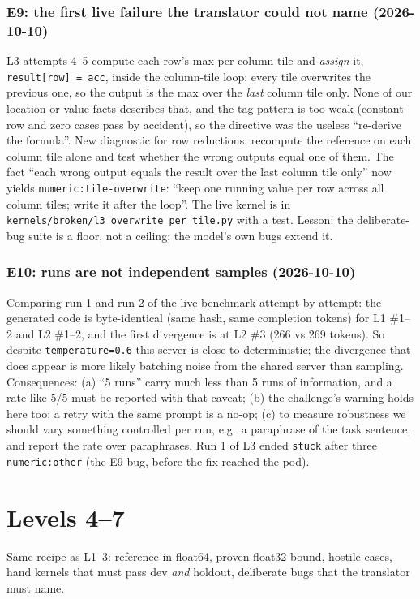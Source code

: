 \documentclass[11pt]{article}
\newcommand{\code}[1]{\texttt{#1}}
\newcommand{\entry}[2]{\subsubsection*{#1 \textnormal{\small(#2)}}}
\begin{document}
\entry{E9: the first live failure the translator could not name}{2026-10-10}
L3 attempts 4--5 compute each row's max per column tile and \emph{assign} it,
\code{result[row] = acc}, inside the column-tile loop: every tile overwrites the previous one, so
the output is the max over the \emph{last} column tile only. None of our location or value facts
describes that, and the tag pattern is too weak (constant-row and zero cases pass by accident), so
the directive was the useless ``re-derive the formula''. New diagnostic for row reductions:
recompute the reference on each column tile alone and test whether the wrong outputs equal one of
them. The fact ``each wrong output equals the result over the last column tile only'' now yields
\code{numeric:tile-overwrite}: ``keep one running value per row across all column tiles; write it
after the loop''. The live kernel is in \code{kernels/broken/l3\_overwrite\_per\_tile.py} with a
test. Lesson: the deliberate-bug suite is a floor, not a ceiling; the model's own bugs extend it.

\entry{E10: runs are not independent samples}{2026-10-10}
Comparing run 1 and run 2 of the live benchmark attempt by attempt: the generated code is
byte-identical (same hash, same completion tokens) for L1 \#1--2 and L2 \#1--2, and the first
divergence is at L2 \#3 (266 vs 269 tokens). So despite \code{temperature=0.6} this server is
close to deterministic; the divergence that does appear is more likely batching noise from the
shared server than sampling. Consequences: (a) ``5 runs'' carry much less than 5 runs of
information, and a rate like 5/5 must be reported with that caveat; (b) the challenge's warning
holds here too: a retry with the same prompt is a no-op; (c) to measure robustness we should vary
something controlled per run, e.g.\ a paraphrase of the task sentence, and report the rate over
paraphrases. Run 1 of L3 ended \code{stuck} after three \code{numeric:other} (the E9 bug, before
the fix reached the pod).

\section{Levels 4--7}
\label{sec:l47}

Same recipe as L1--3: reference in float64, proven float32 bound, hostile cases, hand kernels that
must pass dev \emph{and} holdout, deliberate bugs that the translator must name.
\end{document}
